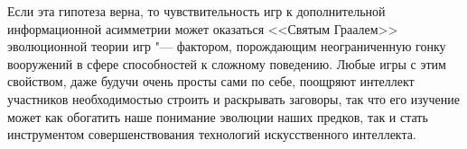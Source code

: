 Если эта гипотеза верна, то чувствительность игр к дополнительной информационной асимметрии может оказаться <<Святым Граалем>> эволюционной теории игр "--- фактором, порождающим неограниченную гонку вооружений в сфере способностей к сложному поведению. Любые игры с этим свойством, даже будучи очень просты сами по себе, поощряют интеллект участников необходимостью строить и раскрывать заговоры, так что его изучение может как обогатить наше понимание эволюции наших предков, так и стать инструментом совершенствования технологий искусственного интеллекта.

\clearpage